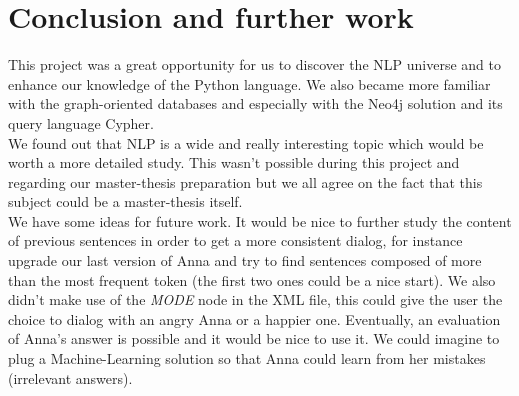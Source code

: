 \section{Conclusion and further work}
This project was a great opportunity for us to discover the NLP universe and to enhance our knowledge of the Python language. We also became more familiar with the graph-oriented databases and especially with the Neo4j solution and its query language Cypher.\\

We found out that NLP is a wide and really interesting topic which would be worth a more detailed study. This wasn't possible during this project and regarding our master-thesis preparation but we all agree on the fact that this subject could be a master-thesis itself.\\

We have some ideas for future work. It would be nice to further study the content of previous sentences in order to get a more consistent dialog, for instance upgrade our last version of Anna and try to find sentences composed of more than the most frequent token (the first two ones could be a nice start). We also didn't make use of the \emph{MODE} node in the XML file, this could give the user the choice to dialog with an angry Anna or a happier one. Eventually, an evaluation of Anna's answer is possible and it would be nice to use it. We could imagine to plug a Machine-Learning solution so that Anna could learn from her mistakes (irrelevant answers).
